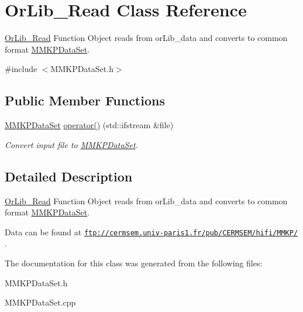 \hypertarget{class_or_lib___read}{\section{Or\+Lib\+\_\+\+Read Class Reference}
\label{class_or_lib___read}
}


\hyperlink{class_or_lib___read}{Or\+Lib\+\_\+\+Read} Function Object reads from or\+Lib\+\_\+data and converts to common format \hyperlink{class_m_m_k_p_data_set}{M\+M\+K\+P\+Data\+Set}.  




{\ttfamily \#include $<$M\+M\+K\+P\+Data\+Set.\+h$>$}

\subsection*{Public Member Functions}
\begin{DoxyCompactItemize}
\item 
\hypertarget{class_or_lib___read_a74e1d387988c29eea5de937d8a02b576}{\hyperlink{class_m_m_k_p_data_set}{M\+M\+K\+P\+Data\+Set} \hyperlink{class_or_lib___read_a74e1d387988c29eea5de937d8a02b576}{operator()} (std\+::ifstream \&file)}\label{class_or_lib___read_a74e1d387988c29eea5de937d8a02b576}

\begin{DoxyCompactList}\small\item\em Convert input file to \hyperlink{class_m_m_k_p_data_set}{M\+M\+K\+P\+Data\+Set}. \end{DoxyCompactList}\end{DoxyCompactItemize}


\subsection{Detailed Description}
\hyperlink{class_or_lib___read}{Or\+Lib\+\_\+\+Read} Function Object reads from or\+Lib\+\_\+data and converts to common format \hyperlink{class_m_m_k_p_data_set}{M\+M\+K\+P\+Data\+Set}. 

Data can be found at \href{ftp://cermsem.univ-paris1.fr/pub/CERMSEM/hifi/MMKP/}{\tt ftp\+://cermsem.\+univ-\/paris1.\+fr/pub/\+C\+E\+R\+M\+S\+E\+M/hifi/\+M\+M\+K\+P/} . 

The documentation for this class was generated from the following files\+:\begin{DoxyCompactItemize}
\item 
M\+M\+K\+P\+Data\+Set.\+h\item 
M\+M\+K\+P\+Data\+Set.\+cpp\end{DoxyCompactItemize}
